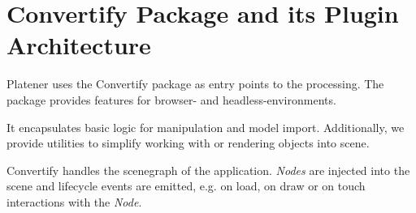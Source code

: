 \documentclass[../ClassicThesis.tex]{subfiles}
\begin{document}

\section{Convertify Package and its Plugin Architecture}

Platener uses the Convertify package as entry points to the {\threedmodel}
processing. The package provides features for browser- and
headless-environments.

It encapsulates basic logic for {\threedmodel} manipulation and model import.
Additionally, we provide utilities to simplify working with \emph{\threejs} or
rendering objects into scene.

Convertify handles the scenegraph of the application. \emph{Nodes} are injected
into the scene  and lifecycle events are emitted, e.g. on
load, on draw or on touch interactions with the \emph{Node}.

\end{document}
